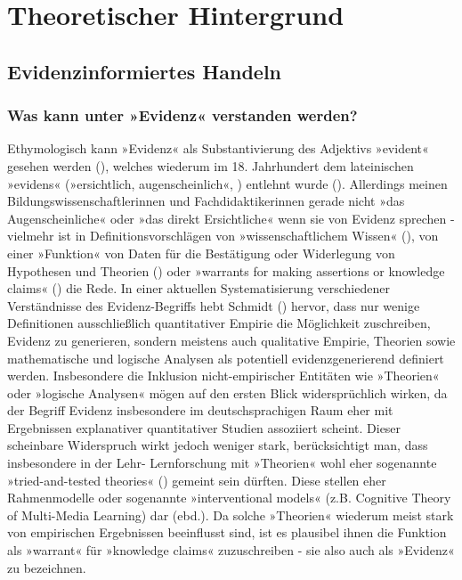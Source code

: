 \documentclass[
  jou,
  floatsintext,
  longtable,
  nolmodern,
  notxfonts,
  notimes,
  colorlinks=true,linkcolor=blue,citecolor=blue,urlcolor=blue]{apa7}
\begin{document}
\section{Theoretischer Hintergrund}\label{theoretischer-hintergrund}

\subsection{Evidenzinformiertes
Handeln}\label{evidenzinformiertes-handeln}

\subsubsection{Was kann unter »Evidenz« verstanden
werden?}\label{was-kann-unter-evidenz-verstanden-werden}

Ethymologisch kann »Evidenz« als Substantivierung des Adjektivs
»evident« gesehen werden (), welches wiederum im 18. Jahrhundert dem lateinischen »evidens«
(»ersichtlich, augenscheinlich«, ) entlehnt wurde ().
Allerdings meinen Bildungswissenschaftlerinnen und Fachdidaktikerinnen
gerade nicht »das Augenscheinliche« oder »das direkt Ersichtliche« wenn
sie von Evidenz sprechen - vielmehr ist in Definitionsvorschlägen von
»wissenschaftlichem Wissen« (), von
einer »Funktion« von Daten für die Bestätigung oder Widerlegung von
Hypothesen und Theorien () oder »warrants for making assertions or knowledge claims«
() die Rede. In
einer aktuellen Systematisierung verschiedener Verständnisse des
Evidenz-Begriffs hebt Schmidt () hervor,
dass nur wenige Definitionen ausschließlich quantitativer Empirie die
Möglichkeit zuschreiben, Evidenz zu generieren, sondern meistens auch
qualitative Empirie, Theorien sowie mathematische und logische Analysen
als potentiell evidenzgenerierend definiert werden. Insbesondere die
Inklusion nicht-empirischer Entitäten wie »Theorien« oder »logische
Analysen« mögen auf den ersten Blick widersprüchlich wirken, da der
Begriff Evidenz insbesondere im deutschsprachigen Raum eher mit
Ergebnissen explanativer quantitativer Studien assoziiert scheint.
Dieser scheinbare Widerspruch wirkt jedoch weniger stark, berücksichtigt
man, dass insbesondere in der Lehr- Lernforschung mit »Theorien« wohl
eher sogenannte »tried-and-tested theories«
() gemeint sein dürften. Diese
stellen eher Rahmenmodelle oder sogenannte »interventional models« (z.B.
Cognitive Theory of Multi-Media Learning) dar (ebd.). Da solche
»Theorien« wiederum meist stark von empirischen Ergebnissen beeinflusst
sind, ist es plausibel ihnen die Funktion als »warrant« für »knowledge
claims« zuzuschreiben - sie also auch als »Evidenz« zu bezeichnen.
\end{document}
